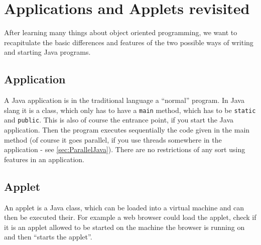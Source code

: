 \section{Applications and Applets revisited}

After learning many things about object oriented programming,
we want to recapitulate the basic differences and features of
the two possible ways of writing and starting Java programs.

\subsection{Application}
A Java application is in the traditional language a ``normal'' program.
In Java slang it is a class, which only has to have a \verb|main|
method, which has to be \verb|static| and \verb|public|. This is also of course the
entrance point, if you start the Java application. Then the program
executes sequentially the code given in the main method (of course it
goes parallel, if you use threads somewhere in the application - see
\ref{sec:ParallelJava}). There are no restrictions of any sort using
features in an application.


\subsection{Applet}
An applet is a Java class, which can be loaded into a virtual machine
and can then be executed their. For example a web browser could load
the applet, check if it is an applet allowed to be started on the
machine the browser is running on and then ``starts the applet''.

